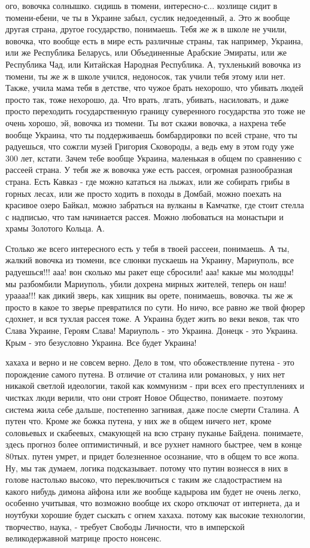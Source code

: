 ого, вовочка солнышко. сидишь в тюмени, интересно-с... козлище сидит в
тюмени-ебени, че ты в Украине забыл, суслик недоеденный, а. Это ж вообще другая
страна, другое государство, понимаешь. Тебя же ж в школе не учили, вовочка, что
вообще есть в мире есть различные страны, так например, Украина, или же
Республика Беларусь, или Объединенные Арабские Эмираты, или же Республика Чад,
или Китайская Народная Республика. А, тухленький вовочка из тюмени, ты же ж в
школе учился, недоносок, так учили тебя этому или нет. Также, учила мама тебя в
детстве, что чужое брать нехорошо, что убивать людей просто так, тоже нехорошо,
да. Что врать, лгать, убивать, насиловать, и даже просто переходить
государственную границу суверенного государства это тоже не очень хорошо, эй,
вовочка из тюмени. Ты вот скажи вовочка, а нахрена тебе вообще Украина, что ты
поддерживаешь бомбардировки по всей стране, что ты радуешься, что сожгли музей
Григория Сковороды, а ведь ему в этом году уже 300 лет, кстати. Зачем тебе
вообще Украина, маленькая в общем по сравнению с рассеей страна. У тебя же ж
вовочка уже есть рассея, огромная разнообразная страна. Есть Кавказ - где можно
кататься на лыжах, или же собирать грибы в горных лесах, или же просто ходить в
походы в Домбай, можно поехать на красивое озеро Байкал, можно забраться на
вулканы в Камчатке, где стоит стелла с надписью, что там начинается рассея.
Можно любоваться на монастыри и храмы Золотого Кольца. А.

Столько же всего интересного есть у тебя в твоей рассееи, понимаешь. А ты,
жалкий вовочка из тюмени, все слюнки пускаешь на Украину, Мариуполь, все
радуешься!!! ааа! вон сколько мы ракет еще сбросили! ааа! какые мы молодцы! мы
разбомбили Мариуполь, убили дохрена мирных жителей, теперь он наш! ураааа!!!
как дикий зверь, как хищник вы орете, понимаешь, вовочка. ты же ж просто в
какое то зверье превратился по сути. Но ничо, все равно же твой фюрер сдохнет,
и вся тухлая рассея тоже. А Украина будет жить во веки веков, так что Слава
Украине, Героям Слава! Мариуполь - это Украина. Донецк - это Украина. Крым -
это безусловно Украина. Все будет Украина!

хахаха и верно и не совсем верно. Дело в том, что обожествление путена - это
порождение самого путена. В отличие от сталина или романовых, у них нет никакой
светлой идеологии, такой как коммунизм - при всех его преступлениях и чистках
люди верили, что они строят Новое Общество, понимаете. поэтому система жила
себе дальше, постепенно загнивая, даже после смерти Сталина. А путен что. Кроме
же божка путена, у них же в общем ничего нет, кроме соловьевых и скабеевых,
смакующей на всю страну пуканье Байдена. понимаете, здесь прогноз более
оптимистичный, и все рухнет намного быстрее, чем в конце 80тых. путен умрет, и
придет болезненное осознание, что в общем то все жопа. Ну, мы так думаем,
логика подсказывает. потому что путин вознесся в них в голове настолько высоко,
что переключиться с таким же сладострастием на какого нибудь димона айфона или
же вообще кадырова им будет не очень легко, особенно учитывая, что возможно
вообще их скоро отключат от интернета, да и ноутбуки хорошие будет сыскать с
огнем хахаха. потому как высокие технологии, творчество, наука, - требует
Свободы Личности, что в имперской великодержавной матрице просто нонсенс.

